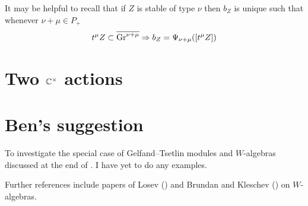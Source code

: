 \documentclass[11pt]{article}
\begin{document}
It may be helpful to recall that if $Z$ is stable of type $\nu$ then $b_Z$ is unique such that whenever $\nu + \mu \in P_+$ 
$$
t^\mu Z \subset \overline{\operatorname{Gr}^{\nu + \mu }} \Rightarrow b_Z = \Psi_{\nu + \mu}([t^\mu Z])
$$

\section{Two $\mathbb C^\times$ actions}

\section{Ben's suggestion} 
To investigate the special case of  Gelfand--Tsetlin modules and $W$-algebras discussed at the end of \cite{kamnitzer2019category}. I have yet to do any examples. 

Further references include papers of Losev (\cite{losev2010finite,losev2010quantized,losev2011finite}) and Brundan and Kleschev (\cite{brundan2006shifted,brundan2009blocks}) on $W$-algebras.
%
%


%
%


%
\end{document}
